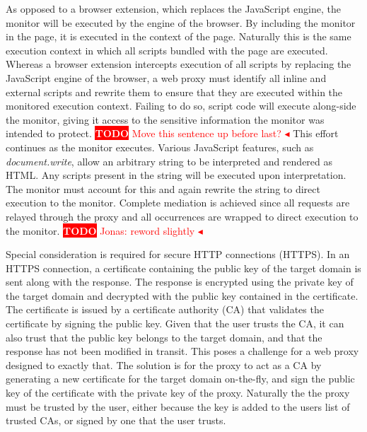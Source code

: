 \documentclass{llncs}
\newcommand{\todo}[1]{\colorbox{red}{\textcolor{white}{\sffamily\bfseries\scriptsize TODO}} \textcolor{red}{#1} \textcolor{red}{$\blacktriangleleft$}}
\begin{document}
As opposed to a browser extension, which replaces the 
JavaScript engine, the monitor will be executed by the engine of the browser. 
By including the monitor in the page, it is executed in the context of the page. Naturally 
this is the same execution context in which all scripts bundled with the 
page are executed. Whereas a 
browser extension intercepts execution of all scripts by replacing the JavaScript 
engine of the browser, a web proxy must identify all inline and 
external scripts and rewrite them to ensure that they are executed within the 
monitored execution context. Failing to do so, script code will execute 
along-side the monitor, giving it access to the sensitive information the 
monitor was intended to protect. 
\todo{Move this sentence up before last?}
This effort continues as the monitor executes. Various JavaScript features, such as 
\emph{document.write}, allow an arbitrary string to be 
interpreted and rendered as HTML. Any scripts present in the string will be 
executed upon interpretation. The monitor must account for this and again rewrite 
the string to direct execution to the monitor.
Complete mediation is achieved since all requests are relayed through the proxy 
and all occurrences are wrapped to direct execution to the monitor.
\todo{Jonas: reword slightly}

Special consideration is required for secure HTTP connections (HTTPS). In an HTTPS 
connection, a certificate containing the public key of the target domain is sent 
along with the response. The response is encrypted using the private key of the target 
domain and decrypted with the public key contained in the certificate. The 
certificate is issued by a certificate authority (CA)
that validates the certificate by signing the public key. Given that the user 
trusts the CA, it can also trust that the public key belongs 
to the target domain, and that the response has not been modified in transit.
This poses a challenge for a web proxy designed to exactly that. The solution 
is for the proxy to act as a CA by generating a
new certificate for the target domain on-the-fly, and sign the 
public key of the certificate with the private key of the proxy. Naturally the 
the proxy must be trusted by the user, either because the key is added to 
the users list of trusted CAs, or signed by one that the user trusts.
\end{document}
